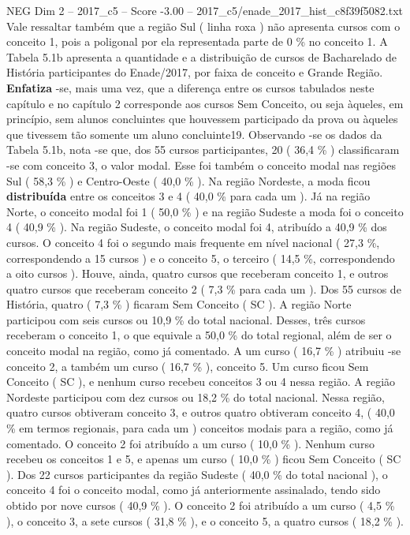 \begin{textsample}{NEG Dim 2 – 2017\_c5 – Score -3.00 – 2017\_c5/enade\_2017\_hist\_c8f39f5082.txt}
Vale ressaltar também que a região Sul ( linha roxa ) não apresenta cursos com o conceito 1, pois a poligonal por ela representada parte de 0 \% no conceito 1.
A Tabela 5.1b apresenta a quantidade e a distribuição de cursos de Bacharelado de História participantes do Enade/2017, por faixa de conceito e Grande Região. \textbf{Enfatiza} -se, mais uma vez, que a diferença entre os cursos tabulados neste capítulo e no capítulo 2 corresponde aos cursos Sem Conceito, ou seja àqueles, em princípio, sem alunos concluintes que houvessem participado da prova ou àqueles que tivessem tão somente um aluno concluinte19.
Observando -se os dados da Tabela 5.1b, nota -se que, dos 55 cursos participantes, 20 ( 36,4 \% ) classificaram -se com conceito 3, o valor modal.
Esse foi também o conceito modal nas regiões Sul ( 58,3 \% ) e Centro-Oeste ( 40,0 \% ).
Na região Nordeste, a moda ficou \textbf{distribuída} entre os conceitos 3 e 4 ( 40,0 \% para cada um ).
Já na região Norte, o conceito modal foi 1 ( 50,0 \% ) e na região Sudeste a moda foi o conceito 4 ( 40,9 \% ).
Na região Sudeste, o conceito modal foi 4, atribuído a 40,9 \% dos cursos.
O conceito 4 foi o segundo mais frequente em nível nacional ( 27,3 \%, correspondendo a 15 cursos ) e o conceito 5, o terceiro ( 14,5 \%, correspondendo a oito cursos ).
Houve, ainda, quatro cursos que receberam conceito 1, e outros quatro cursos que receberam conceito 2 ( 7,3 \% para cada um ).
Dos 55 cursos de História, quatro ( 7,3 \% ) ficaram Sem Conceito ( SC ).
A região Norte participou com seis cursos ou 10,9 \% do total nacional.
Desses, três cursos receberam o conceito 1, o que equivale a 50,0 \% do total regional, além de ser o conceito modal na região, como já comentado.
A um curso ( 16,7 \% ) atribuiu -se conceito 2, a também um curso ( 16,7 \% ), conceito 5.
Um curso ficou Sem Conceito ( SC ), e nenhum curso recebeu conceitos 3 ou 4 nessa região.
A região Nordeste participou com dez cursos ou 18,2 \% do total nacional.
Nessa região, quatro cursos obtiveram conceito 3, e outros quatro obtiveram conceito 4, ( 40,0 \% em termos regionais, para cada um ) conceitos modais para a região, como já comentado.
O conceito 2 foi atribuído a um curso ( 10,0 \% ).
Nenhum curso recebeu os conceitos 1 e 5, e apenas um curso ( 10,0 \% ) ficou Sem Conceito ( SC ).
Dos 22 cursos participantes da região Sudeste ( 40,0 \% do total nacional ), o conceito 4 foi o conceito modal, como já anteriormente assinalado, tendo sido obtido por nove cursos ( 40,9 \% ).
O conceito 2 foi atribuído a um curso ( 4,5 \% ), o conceito 3, a sete cursos ( 31,8 \% ), e o conceito 5, a quatro cursos ( 18,2 \% ).

\end{textsample}
